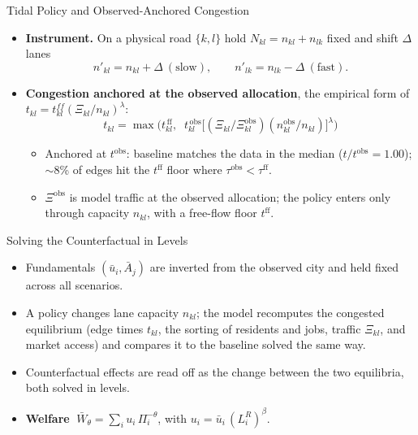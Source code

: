 \documentclass[11pt,aspectratio=169]{beamer}
\newcommand{\good}[1]{\textcolor{blue!70!black}{#1}}
\begin{document}
\begin{frame}{Tidal Policy and Observed-Anchored Congestion}
\begin{itemize}
  \item \textbf{Instrument.} On a physical road $\{k,l\}$ hold $N_{kl}=n_{kl}+n_{lk}$ fixed and shift $\Delta$ lanes
  \vspace{-0.4em}\begin{equation}
    n'_{kl}=n_{kl}+\Delta\ (\text{slow}),\qquad n'_{lk}=n_{lk}-\Delta\ (\text{fast}).
  \end{equation}
  \item \textbf{Congestion anchored at the observed allocation}, the empirical form of $t_{kl}=t_{kl}^{ff}(\Xi_{kl}/n_{kl})^{\lambda}$:
  \vspace{-0.4em}\begin{equation}\label{eq:anchor}
    t_{kl}=\max\!\Big( t_{kl}^{\,\mathrm{ff}},\;\;
    t_{kl}^{\,\mathrm{obs}}\big[(\Xi_{kl}/\Xi_{kl}^{\mathrm{obs}})(n_{kl}^{\mathrm{obs}}/n_{kl})\big]^{\lambda}\Big)
  \end{equation}
  \begin{itemize}\footnotesize
    \item Anchored at $t^{\mathrm{obs}}$: baseline \good{matches the data in the median} ($t/t^{\mathrm{obs}}=1.00$); $\sim$8\% of edges hit the $t^{\mathrm{ff}}$ floor where $\tau^{\mathrm{obs}}<\tau^{\mathrm{ff}}$.
    \item $\Xi^{\mathrm{obs}}$ is model traffic at the observed allocation; the policy enters only through capacity $n_{kl}$, with a free-flow floor $t^{\mathrm{ff}}$.
  \end{itemize}
\end{itemize}
\end{frame}

\begin{frame}{Solving the Counterfactual in Levels}
\begin{itemize}
  \item Fundamentals $(\bar u_i,\bar A_j)$ are inverted from the observed city and \good{held fixed} across all scenarios.
  \item A policy changes lane capacity $n_{kl}$; the model recomputes the \good{congested equilibrium} (edge times $t_{kl}$, the sorting of residents and jobs, traffic $\Xi_{kl}$, and market access) and compares it to the baseline solved the same way.
  \item Counterfactual effects are read off as the change between the two equilibria, both solved in levels.
  \item \textbf{Welfare} $\;\bar W_\theta=\sum_i u_i\,\Pi_i^{-\theta}$, with $u_i=\bar u_i\,(L_i^R)^{\beta}$.
\end{itemize}
\end{frame}
\end{document}
